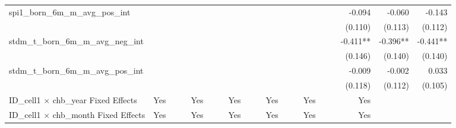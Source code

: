 \begin{tabular}{lrrrrrrrrrrrrrrrrrr}
spi1\_born\_6m\_m\_avg\_pos\_int            &             &             &             &             &             &             &             &             &             &             &             &             &             &             &             &      -0.094 &      -0.060 &      -0.143 \\ 
                                            &             &             &             &             &             &             &             &             &             &             &             &             &             &             &             &     (0.110) &     (0.113) &     (0.112) \\ 
stdm\_t\_born\_6m\_m\_avg\_neg\_int         &             &             &             &             &             &             &             &             &             &             &             &             &             &             &             &    -0.411** &    -0.396** &    -0.441** \\ 
                                            &             &             &             &             &             &             &             &             &             &             &             &             &             &             &             &     (0.146) &     (0.140) &     (0.140) \\ 
stdm\_t\_born\_6m\_m\_avg\_pos\_int         &             &             &             &             &             &             &             &             &             &             &             &             &             &             &             &      -0.009 &      -0.002 &       0.033 \\ 
                                            &             &             &             &             &             &             &             &             &             &             &             &             &             &             &             &     (0.118) &     (0.112) &     (0.105) \\ 
\midrule
ID\_cell1 $\times$ chb\_year Fixed Effects  &         Yes &             &             &         Yes &             &             &         Yes &             &             &         Yes &             &             &         Yes &             &             &         Yes &             &             \\ 
ID\_cell1 $\times$ chb\_month Fixed Effects &         Yes &             &             &         Yes &             &             &         Yes &             &             &         Yes &             &             &         Yes &             &             &         Yes &             &             \\ 

\end{tabular}
